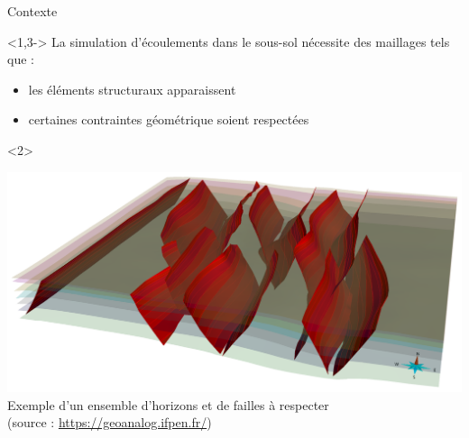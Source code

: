 \documentclass[aspectratio=169, 12pt, a4paper, hyperref={pdfauthor={Alexandre MARIN}, pdfkeywords={IFPEN, Delaunay, Voronoi, mesh generation}, colorlinks=true, linkcolor=purple, urlcolor=blue, citecolor=magenta}]{beamer}
\begin{document}
\begin{Energie}{Contexte}

\begin{visibleenv}<1,3->
La simulation d'écoulements dans le sous-sol nécessite des maillages tels que :
\begin{itemize}
\item<1,3,4,5> les éléments structuraux apparaissent
\item<3-> certaines contraintes géométrique soient respectées
\end{itemize}
\end{visibleenv}

\begin{onlyenv}<2>
\begin{center}\vspace{-1cm}
\includegraphics[scale=0.27]{Analog.png}
\\Exemple d'un ensemble d'horizons et de failles à respecter\\(source : \url{https://geoanalog.ifpen.fr/})
\end{center}
\end{onlyenv}



\end{Energie}
\end{document}
